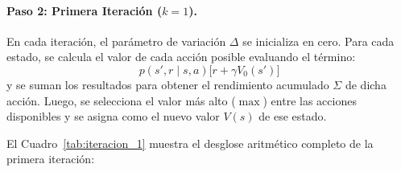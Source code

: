 \paragraph{Paso 2: Primera Iteración ($k = 1$).}
En cada iteración, el parámetro de variación $\Delta$ se inicializa en cero. Para cada estado, se calcula el valor de cada acción posible evaluando el término:
\begin{equation}
  p(s', r \mid s, a) \Big[ r + \gamma V_0(s') \Big]
\end{equation}
y se suman los resultados para obtener el rendimiento acumulado $\Sigma$ de dicha acción. Luego, se selecciona el valor más alto ($\max$) entre las acciones disponibles y se asigna como el nuevo valor $V(s)$ de ese estado.

El Cuadro~\ref{tab:iteracion_1} muestra el desglose aritmético completo de la primera iteración:

